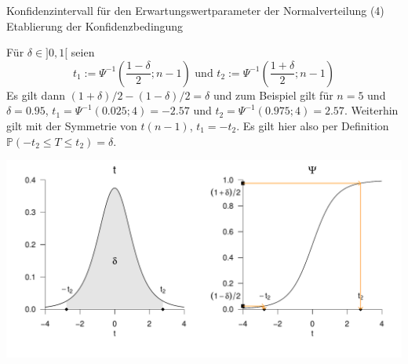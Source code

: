 \documentclass[
  8pt,
  ignorenonframetext,
]{beamer}
\begin{document}
\begin{frame}{Konfidenzintervall für den Erwartungswertparameter der
Normalverteilung}
\protect\hypertarget{konfidenzintervall-fuxfcr-den-erwartungswertparameter-der-normalverteilung-3}{}
\noindent (4) Etablierung der Konfidenzbedingung

\small

Für \(\delta \in ]0,1[\) seien \begin{equation}
t_1 := \Psi^{-1}\left(\frac{1 - \delta}{2}; n - 1\right)
\mbox{ und }
t_2 := \Psi^{-1}\left(\frac{1 + \delta}{2}; n-1\right)
\end{equation} Es gilt dann \((1 + \delta)/2 - (1 - \delta)/2 = \delta\)
und zum Beispiel gilt für \(n = 5\) und \(\delta = 0.95\),
\(t_1 = \Psi^{-1}(0.025;4) = -2.57\) und
\(t_2 = \Psi^{-1}(0.975;4) = 2.57\). Weiterhin gilt mit der Symmetrie
von \(t(n-1)\), \(t_1 = - t_2\). Es gilt hier also per Definition
\(\mathbb{P}\left(-t_2 \le T \le t_2 \right) = \delta\).

\vspace{2mm}

\begin{center}\includegraphics[width=0.8\linewidth]{11_Abbildungen/wtfi_11_ki_t_konfidenzbedingung} \end{center}
\end{frame}
\end{document}
